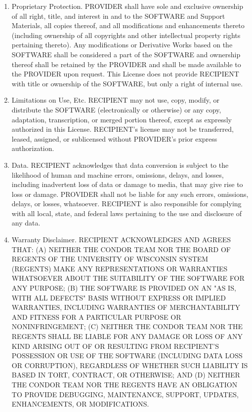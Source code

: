 \begin{enumerate}
\item Proprietary Protection.  PROVIDER shall have sole and exclusive
ownership of all right, title, and interest in and to the SOFTWARE and
Support Materials, all copies thereof, and all modifications and
enhancements thereto (including ownership of all copyrights and other
intellectual property rights pertaining thereto).  Any modifications
or Derivative Works based on the SOFTWARE shall be considered a part
of the SOFTWARE and ownership thereof shall be retained by the
PROVIDER and shall be made available to the PROVIDER upon request.
This License does not provide RECIPIENT with title or ownership of the
SOFTWARE, but only a right of internal use. 

\item Limitations on Use, Etc.  RECIPIENT may not use, copy, modify,
or distribute the SOFTWARE (electronically or otherwise) or any copy,
adaptation, transcription, or merged portion thereof, except as
expressly authorized in this License.  RECIPIENT's license may not
be transferred, leased, assigned, or sublicensed without PROVIDER's
prior express authorization. 

\item Data.  RECIPIENT acknowledges that data conversion is subject to
the likelihood of human and machine errors, omissions, delays, and
losses, including inadvertent loss of data or damage to media, that
may give rise to loss or damage.  PROVIDER shall not be liable for any
such errors, omissions, delays, or losses, whatsoever.  RECIPIENT is
also responsible for complying with all local, state, and federal laws
pertaining to the use and disclosure of any data.

\item Warranty Disclaimer.  RECIPIENT ACKNOWLEDGES AND AGREES THAT:
(A) NEITHER THE CONDOR TEAM NOR THE BOARD OF REGENTS OF THE UNIVERSITY
OF WISCONSIN SYSTEM (REGENTS) MAKE ANY REPRESENTATIONS OR WARRANTIES
WHATSOEVER ABOUT THE SUITABILITY OF THE SOFTWARE FOR ANY PURPOSE; (B)
THE SOFTWARE IS PROVIDED ON AN "AS IS, WITH ALL DEFECTS" BASIS WITHOUT
EXPRESS OR IMPLIED WARRANTIES, INCLUDING WARRANTIES OF MERCHANTABILITY
AND FITNESS FOR A PARTICULAR PURPOSE OR NONINFRINGEMENT; (C) NEITHER
THE CONDOR TEAM NOR THE REGENTS SHALL BE LIABLE FOR ANY DAMAGE OR LOSS
OF ANY KIND ARISING OUT OF OR RESULTING FROM RECIPIENT'S POSSESSION
OR USE OF THE SOFTWARE (INCLUDING DATA LOSS OR CORRUPTION), REGARDLESS
OF WHETHER SUCH LIABILITY IS BASED IN TORT, CONTRACT, OR OTHERWISE;
AND (D) NEITHER THE CONDOR TEAM NOR THE REGENTS HAVE AN OBLIGATION TO
PROVIDE DEBUGGING, MAINTENANCE, SUPPORT, UPDATES, ENHANCEMENTS, OR
MODIFICATIONS.


\end{enumerate}
